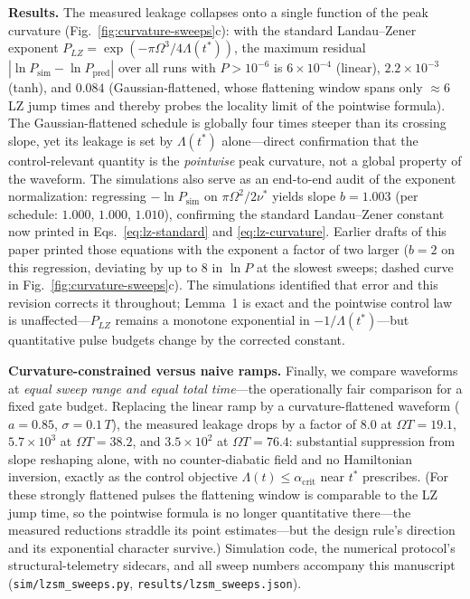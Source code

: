 \documentclass[11pt]{article}
\begin{document}
\textbf{Results.} The measured leakage collapses onto a single function of the peak curvature (Fig.~\ref{fig:curvature-sweeps}c): with the standard Landau--Zener exponent $P_{LZ} = \exp(-\pi\Omega^3/4\Lambda(t^*))$, the maximum residual $|\ln P_{\mathrm{sim}} - \ln P_{\mathrm{pred}}|$ over all runs with $P > 10^{-6}$ is $6\times10^{-4}$ (linear), $2.2\times10^{-3}$ (tanh), and $0.084$ (Gaussian-flattened, whose flattening window spans only $\approx 6$ LZ jump times and thereby probes the locality limit of the pointwise formula). The Gaussian-flattened schedule is globally four times steeper than its crossing slope, yet its leakage is set by $\Lambda(t^*)$ alone---direct confirmation that the control-relevant quantity is the \emph{pointwise} peak curvature, not a global property of the waveform. The simulations also serve as an end-to-end audit of the exponent normalization: regressing $-\ln P_{\mathrm{sim}}$ on $\pi\Omega^2/2\nu^*$ yields slope $b = 1.003$ (per schedule: $1.000$, $1.000$, $1.010$), confirming the standard Landau--Zener constant now printed in Eqs.~\eqref{eq:lz-standard} and \eqref{eq:lz-curvature}. Earlier drafts of this paper printed those equations with the exponent a factor of two larger ($b = 2$ on this regression, deviating by up to $8$ in $\ln P$ at the slowest sweeps; dashed curve in Fig.~\ref{fig:curvature-sweeps}c). The simulations identified that error and this revision corrects it throughout; Lemma~1 is exact and the pointwise control law is unaffected---$P_{LZ}$ remains a monotone exponential in $-1/\Lambda(t^*)$---but quantitative pulse budgets change by the corrected constant.

\textbf{Curvature-constrained versus naive ramps.} Finally, we compare waveforms at \emph{equal sweep range and equal total time}---the operationally fair comparison for a fixed gate budget. Replacing the linear ramp by a curvature-flattened waveform ($a = 0.85$, $\sigma = 0.1\,T$), the measured leakage drops by a factor of $8.0$ at $\Omega T = 19.1$, $5.7\times10^{3}$ at $\Omega T = 38.2$, and $3.5\times10^{2}$ at $\Omega T = 76.4$: substantial suppression from slope reshaping alone, with no counter-diabatic field and no Hamiltonian inversion, exactly as the control objective $\Lambda(t) \le \alpha_{\mathrm{crit}}$ near $t^*$ prescribes. (For these strongly flattened pulses the flattening window is comparable to the LZ jump time, so the pointwise formula is no longer quantitative there---the measured reductions straddle its point estimates---but the design rule's direction and its exponential character survive.) Simulation code, the numerical protocol's structural-telemetry sidecars, and all sweep numbers accompany this manuscript (\texttt{sim/lzsm\_sweeps.py}, \texttt{results/lzsm\_sweeps.json}).
\end{document}
